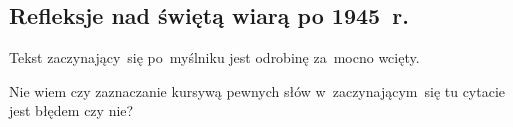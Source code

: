 \documentclass[a4paper,11pt]{article}
\begin{document}
\vspace{\spaceTwo}










\subsection{Refleksje nad świętą wiarą po 1945~r.}

\vspace{\spaceThree}




\start {} Tekst zaczynający~się po~myślniku jest odrobinę za~mocno wcięty.

\vspace{\spaceFour}


\start {} Nie wiem czy zaznaczanie kursywą pewnych słów w~zaczynającym~się tu cytacie jest błędem czy nie?

\vspace{\spaceFour}
\end{document}

